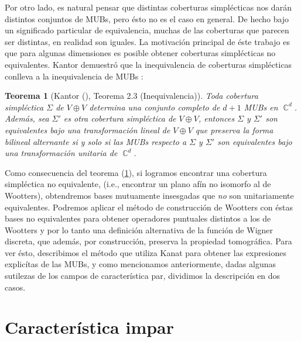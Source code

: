 \documentclass[a4paper,11pt]{report}
\DeclareMathOperator{\C}{\mathbb{C}}
\newtheorem{theorem}{Teorema}
\begin{document}
  Por otro lado, es natural pensar que distintas coberturas
  simplécticas nos darán distintos conjuntos de MUBs, pero
  ésto no es el caso en general. De hecho bajo un
  significado particular de equivalencia, muchas de las
  coberturas que parecen ser distintas, en realidad son
  iguales. La motivación principal de éste trabajo es que
  para algunas dimensiones es posible obtener coberturas
  simplécticas no equivalentes. Kantor demuestró que la
  inequivalencia de coberturas simplécticas conlleva a la
  inequivalencia de MUBs \cite{kantor2012}:
  \begin{theorem}[Kantor (\cite{kantor2012}), Teorema 2.3
    (Inequivalencia)]
    \label{thm:kantor_ineq}
    Toda cobertura simpléctica $\Sigma$ de $V \oplus V$
    determina una conjunto completo de $d+1$ MUBs en
    $\C^{d}$. Además, sea $\Sigma'$ es otra cobertura
    simpléctica de $V \oplus V$, entonces $\Sigma$ y
    $\Sigma'$ son equivalentes bajo una transformación
    lineal de $V \oplus V$ que preserva la forma bilineal
    alternante si y solo si las MUBs respecto a  $\Sigma$ y
    $\Sigma'$ son equivalentes bajo una transformación
    unitaria de $\C^{d}$.
  \end{theorem}

  Como consecuencia del teorema (\ref{thm:kantor_ineq}), si
  logramos encontrar una cobertura simpléctica no
  equivalente, (i.e., encontrar un plano afín no isomorfo al
  de Wootters), obtendremos bases mutuamente insesgadas que
  \textit{no} son unitariamente equivalentes. Podremos
  aplicar el método de construcción de Wootters con éstas
  bases no equivalentes para obtener operadores puntuales
  distintos a los de Wootters y por lo tanto una definición
  alternativa de la función de Wigner discreta, que además,
  por construcción, preserva la propiedad tomográfica. Para
  ver ésto, describimos el método que utiliza Kanat para
  obtener las expresiones explicítas de las MUBs, y como
  mencionamos anteriormente, dadas algunas sutilezas de los
  campos de característica par, dividimos la descripción en
  dos casos.
  
  \section{Característica impar}
\end{document}
